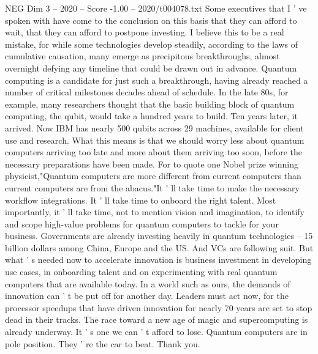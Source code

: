 \begin{textsample}{NEG Dim 3 – 2020 – Score -1.00 – 2020/t004078.txt}
Some executives that I ' ve spoken with have come to the conclusion on this basis that they can afford to wait, that they can afford to postpone investing.
I believe this to be a real mistake, for while some technologies develop steadily, according to the laws of cumulative causation, many emerge as precipitous breakthroughs, almost overnight defying any timeline that could be drawn out in advance.
Quantum computing is a candidate for just such a breakthrough, having already reached a number of critical milestones decades ahead of schedule.
In the late 80s, for example, many researchers thought that the basic building block of quantum computing, the qubit, would take a hundred years to build.
Ten years later, it arrived.
Now IBM has nearly 500 qubits across 29 machines, available for client use and research.
What this means is that we should worry less about quantum computers arriving too late and more about them arriving too soon, before the necessary preparations have been made.
For to quote one Nobel prize winning physicist,"Quantum computers are more different from current computers than current computers are from the abacus."It ' ll take time to make the necessary workflow integrations.
It ' ll take time to onboard the right talent.
Most importantly, it ' ll take time, not to mention vision and imagination, to identify and scope high-value problems for quantum computers to tackle for your business.
Governments are already investing heavily in quantum technologies -- 15 billion dollars among China, Europe and the US.
And VCs are following suit.
But what ' s needed now to accelerate innovation is business investment in developing use cases, in onboarding talent and on experimenting with real quantum computers that are available today.
In a world such as ours, the demands of innovation can ' t be put off for another day.
Leaders must act now, for the processor speedups that have driven innovation for nearly 70 years are set to stop dead in their tracks.
The race toward a new age of magic and supercomputing is already underway.
It ' s one we can ' t afford to lose.
Quantum computers are in pole position.
They ' re the car to beat.
Thank you.

\end{textsample}
